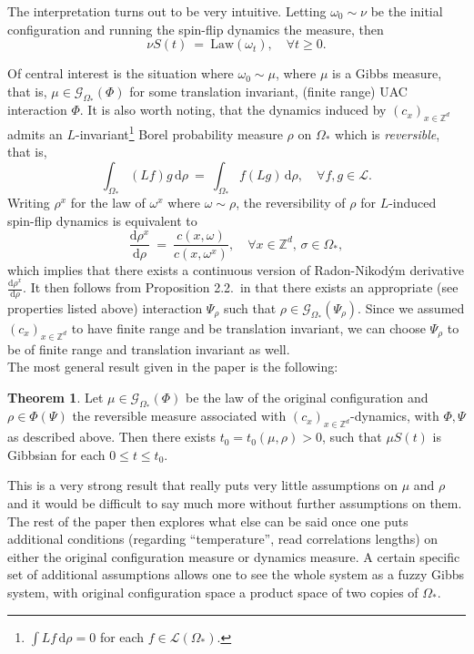 \documentclass[12pt]{article}
\renewcommand{\d}{\mathrm{d}}
\newcommand{\G}{\mathcal{G}}
\newcommand{\Loc}{\mathcal{L}}
\newcommand{\Z}{\mathbb{Z}}
\newcommand{\Law}{\mathrm{Law}}
\newcommand{\1}{\mathbbm{1}}
\newcommand{\5}{\vspace{0.5cm}}
\theoremstyle{definition}
\newtheorem{thm}{Theorem}[section]
\begin{document}
The interpretation turns out to be very intuitive. Letting $\omega_0\sim\nu$ be the initial configuration and running the spin-flip dynamics the measure, then
$$\nu S(t) ~=~ \Law(\omega_t), \quad \forall t\geq 0.$$ 

Of central interest is the situation where $\omega_0\sim\mu$, where $\mu$ is a Gibbs measure, that is, $\mu\in\G_{\Omega_*}(\Phi)$ for some translation invariant, (finite range) UAC interaction $\Phi$. It is also worth noting, that the dynamics induced by $(c_x)_{x\in\Z^d}$ admits an $L$-invariant\footnote{$\int Lf\,\d\rho=0$ for each $f\in\Loc(\Omega_*)$.} Borel probability measure $\rho$ on $\Omega_*$ which is \textit{reversible}, that is,
$$\int_{\Omega_*}(Lf)g\,\d\rho ~=~ \int_{\Omega_*}f(Lg)\,\d\rho, \quad \forall f,g\in\Loc.$$
Writing $\rho^x$ for the law of $\omega^x$ where $\omega\sim\rho$, the reversibility of $\rho$ for $L$-induced spin-flip dynamics is equivalent to
$$\frac{\d\rho^x}{\d\rho} ~=~ \frac{c(x,\omega)}{c(x,\omega^x)}, \quad \forall x\in\Z^d,\,\sigma\in\Omega_*,$$
which implies that there exists a continuous version of Radon-Nikod\'ym derivative $\frac{\d\rho^x}{\d\rho}$. It then follows from Proposition 2.2.~in \cite{EFHR} that there exists an appropriate (see properties listed above) interaction $\Psi_\rho$ such that $\rho\in\G_{\Omega_*}(\Psi_\rho)$. Since we assumed $(c_{x})_{x\in\Z^d}$ to have finite range and be translation invariant, we can choose $\Psi_\rho$ to be of finite range and translation invariant as well.\\

The most general result given in the paper is the following:

\begin{thm}
Let $\mu\in\G_{\Omega_*}(\Phi)$ be the law of the original configuration and $\rho\in\Phi(\Psi)$ the reversible measure associated with $(c_x)_{x\in\Z^d}$-dynamics, with $\Phi,\Psi$ as described above. Then there exists $t_0=t_0(\mu,\rho)>0$, such that $\mu S(t)$ is Gibbsian for each $0\leq t\leq t_0$. 
\end{thm}

This is a very strong result that really puts very little assumptions on $\mu$ and $\rho$ and it would be difficult to say much more without further assumptions on them. The rest of the paper then explores what else can be said once one puts additional conditions (regarding ``temperature'', read correlations lengths) on either the original configuration measure or dynamics measure. A certain specific set of additional assumptions allows one to see the whole system as a fuzzy Gibbs system, with original configuration space a product space of two copies of $\Omega_*$.
 
\end{document}

